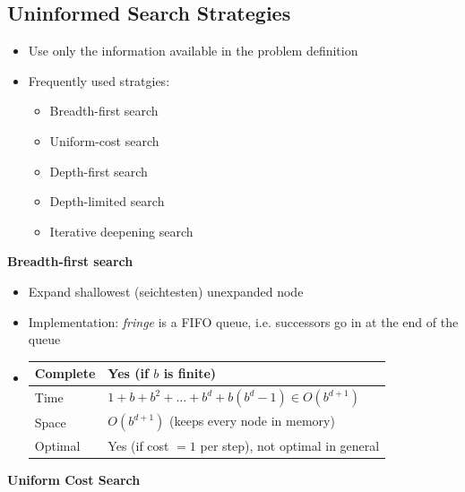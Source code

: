 \documentclass{scrartcl}
\begin{document}
\subsection{Uninformed Search Strategies}
\begin{itemize}
    \item
        Use only the information available in the problem definition
    \item
        Frequently used stratgies:
        \begin{itemize}
            \item
                Breadth-first search
            \item
                Uniform-cost search
            \item
                Depth-first search
            \item
                Depth-limited search
            \item
                Iterative deepening search
        \end{itemize}
\end{itemize}
\textbf{Breadth-first search}
\begin{itemize}
    \item
        Expand shallowest (seichtesten) unexpanded node
    \item
        Implementation: \textit{fringe} is a FIFO queue, i.e. successors go in at the end of the queue
    \item
        \begin{tabular}{|l|l|}
            \hline
            Complete & Yes (if $b$ is finite)\\ \hline
            Time & $1+b+b^2+\dots+b^d + b(b^d -1) \in O(b^{d+1})$\\ \hline
            Space & $O(b^{d+1})$ (keeps every node in memory)\\ \hline
            Optimal & Yes (if cost $=1$ per step), not optimal in general \\ \hline
        \end{tabular}
\end{itemize}
\textbf{Uniform Cost Search}
\end{document}
